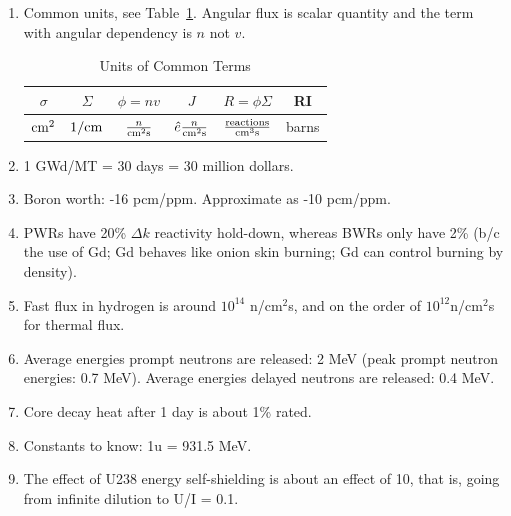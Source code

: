 \documentclass{school-22.211-notes}
\date{May 23, 2012}
\begin{document}
\maketitle


\begin{enumerate}
\item Common units, see Table~\ref{units}. Angular flux is scalar quantity and the term with angular dependency is $n$ not $v$. 
\begin{table}[ht]
  \centering
  \begin{tabular}{|c|c|c|c|c|c|} \hline
   $\sigma$ & $\Sigma$ & $\phi = nv$  & $J$ & $R = \phi \Sigma$ & RI  \\ \hline
   $\mathrm{cm}^2$ & $1/\mathrm{cm}$ & $\frac{n}{\mathrm{cm}^2 \mathrm{s}}$  & $\hat{e} \frac{n}{\mathrm{cm}^2 \mathrm{s}}$ & $\frac{\mathrm{reactions}}{\mathrm{cm}^3 \mathrm{s}}$ & barns \\ \hline
  \end{tabular}
  \caption{Units of Common Terms} \label{units}
\end{table}
\item 1 GWd/MT = 30 days = 30 million dollars. 
\item Boron worth: -16 pcm/ppm. Approximate as -10 pcm/ppm. 
\item PWRs have 20\% $\Delta k$ reactivity hold-down, whereas BWRs only have 2\% (b/c the use of Gd; Gd behaves like onion skin burning; Gd can control burning by density). 
\item Fast flux in hydrogen is around $10^{14}$ n/cm$^2$s, and on the order of $10^{12}$n/cm$^2$s for thermal flux. 
\item Average energies prompt neutrons are released: 2 MeV (peak prompt neutron energies: 0.7 MeV). Average energies delayed neutrons are released: 0.4 MeV. 
\item Core decay heat after 1 day is about 1\% rated. 
\item Constants to know: 1u = 931.5 MeV. 
\item The effect of U238 energy self-shielding is about an effect of 10, that is, going from infinite dilution to U/I = 0.1. 


\end{enumerate}
\end{document}
